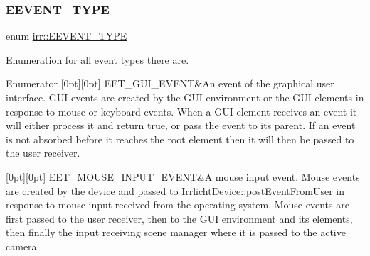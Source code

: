 \subsubsection{\texorpdfstring{E\+E\+V\+E\+N\+T\+\_\+\+T\+Y\+PE}{EEVENT\_TYPE}\hspace{0.1cm}{\footnotesize\ttfamily [2/2]}}
{\footnotesize\ttfamily enum \hyperlink{namespaceirr_ac9eed96e06e85ce3c86fcbbbe9e48a0c}{irr\+::\+E\+E\+V\+E\+N\+T\+\_\+\+T\+Y\+PE}}



Enumeration for all event types there are. 

\begin{DoxyEnumFields}{Enumerator}
[0pt][0pt]{}\mbox{\label{namespaceirr_ac9eed96e06e85ce3c86fcbbbe9e48a0ca722f7807c115f23756853584a3f6d5f6}} 
E\+E\+T\+\_\+\+G\+U\+I\+\_\+\+E\+V\+E\+NT&An event of the graphical user interface. G\+UI events are created by the G\+UI environment or the G\+UI elements in response to mouse or keyboard events. When a G\+UI element receives an event it will either process it and return true, or pass the event to its parent. If an event is not absorbed before it reaches the root element then it will then be passed to the user receiver. \\
\hline

[0pt][0pt]{}\mbox{\label{namespaceirr_ac9eed96e06e85ce3c86fcbbbe9e48a0ca5467579b5240c886d12f33854e74a93d}} 
E\+E\+T\+\_\+\+M\+O\+U\+S\+E\+\_\+\+I\+N\+P\+U\+T\+\_\+\+E\+V\+E\+NT&A mouse input event. Mouse events are created by the device and passed to \hyperlink{classirr_1_1IrrlichtDevice_abf859e39f017b0403c6ed331e48e01df}{Irrlicht\+Device\+::post\+Event\+From\+User} in response to mouse input received from the operating system. Mouse events are first passed to the user receiver, then to the G\+UI environment and its elements, then finally the input receiving scene manager where it is passed to the active camera. \\
\hline


\end{DoxyEnumFields}
